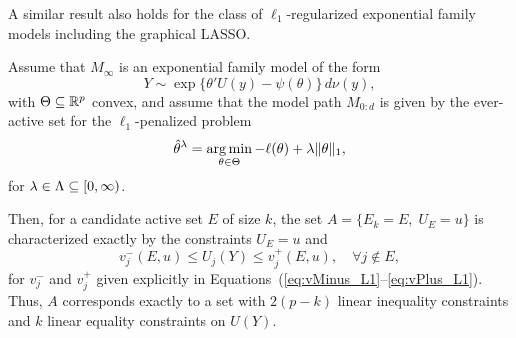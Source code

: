 \documentclass{article}
\begin{document}
A similar result also holds for the class of $\ell_1$-regularized exponential family models including the graphical LASSO.

\begin{theorem}
  Assume that $M_\infty$ is an exponential family model
  of the form
  \[
  Y \sim \exp\{ \theta'U(y) - \psi(\theta) \}\,d\nu(y),
  \]
  with $\Theta \subseteq \mathbb{R}^p$ convex, and assume
  that the model path $M_{0:d}$ is given 
  by the ever-active set for the $\ell_1$-penalized problem
  \begin{equation}\label{eq:regProblem}
  \hat\theta^\lambda = \operatorname*{arg\,min}_{\theta\in \Theta} 
  -\ell(\theta) + \lambda\|\theta\|_1,
  \end{equation}
  for $\lambda\in \Lambda \subseteq [0,\infty)$.

  Then, for a candidate active set $E$ of size $k$, 
  the set $A = \{E_k = E, \;U_E = u\}$ is characterized 
  exactly by the constraints $U_E = u$ and
  \[
  v_j^-(E,u) \leq U_j(Y) \leq v_j^+(E,u), \quad\forall j \notin E,
  \]
  for $v_j^-$ and $v_j^+$ given explicitly in
  Equations~(\ref{eq:vMinus_L1}--\ref{eq:vPlus_L1}).
  Thus, $A$ corresponds exactly to 
  a set with $2(p-k)$ linear inequality constraints and $k$
  linear equality constraints on $U(Y)$.
\end{theorem}

\end{document}
